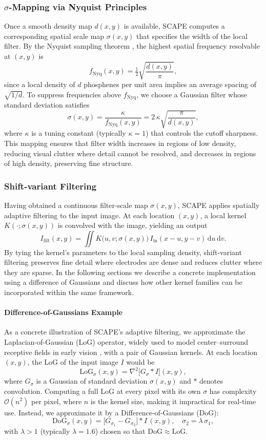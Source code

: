 \subsubsection{\(\sigma\)-Mapping via Nyquist Principles}
Once a smooth density map \(d(x,y)\) is available, SCAPE computes a corresponding spatial scale map \(\sigma(x,y)\) that specifies the width of the local filter. By the Nyquist sampling theorem \cite{Nyquist1928}, the highest spatial frequency resolvable at \((x,y)\) is
\[
f_{\mathrm{Nyq}}(x,y)
=\tfrac{1}{2}\sqrt{\frac{d(x,y)}{\pi}},
\]
since a local density of \(d\) phosphenes per unit area implies an average spacing of \(\sqrt{1/d}\). To suppress frequencies above \(f_{\mathrm{Nyq}}\), we choose a Gaussian filter whose standard deviation satisfies
\[
\sigma(x,y)
= \frac{\kappa}{f_{\mathrm{Nyq}}(x,y)}
= 2\,\kappa\sqrt{\frac{\pi}{d(x,y)}},
\]
where \(\kappa\) is a tuning constant (typically \(\kappa=1\)) that controls the cutoff sharpness. This mapping ensures that filter width increases in regions of low density, reducing visual clutter where detail cannot be resolved, and decreases in regions of high density, preserving fine structure.


\subsubsection{Shift-variant Filtering}
Having obtained a continuous filter‐scale map \(\sigma(x,y)\), SCAPE applies spatially adaptive filtering to the input image. At each location \((x,y)\), a local kernel \(K(\cdot;\sigma(x,y))\) is convolved with the image, yielding an output
\[
I_{\mathrm{filt}}(x,y)
=\iint K\bigl(u,v;\sigma(x,y)\bigr)\,
I_{\mathrm{in}}(x-u,y-v)\,\mathrm{d}u\,\mathrm{d}v.
\]
By tying the kernel’s parameters to the local sampling density, shift‐variant filtering preserves fine detail where electrodes are dense and reduces clutter where they are sparse. In the following sections we describe a concrete implementation using a difference of Gaussians and discuss how other kernel families can be incorporated within the same framework.


\paragraph{Difference-of-Gaussians Example}
As a concrete illustration of SCAPE’s adaptive filtering, we approximate the Laplacian-of-Gaussian (LoG) operator, widely used to model center–surround receptive fields in early vision \cite{Young1987}, with a pair of Gaussian kernels.  At each location \((x,y)\), the LoG of the input image \(I\) would be
\[
\mathrm{LoG}_{\sigma}(x,y)
=\nabla^2\bigl[G_{\sigma} * I\bigr](x,y),
\]
where \(G_{\sigma}\) is a Gaussian of standard deviation \(\sigma(x,y)\) and \(*\) denotes convolution.  Computing a full LoG at every pixel with its own \(\sigma\) has complexity \(\mathcal{O}(n^2)\) per pixel, where \(n\) is the kernel size, making it impractical for real-time use.  Instead, we approximate it by a Difference-of-Gaussians (DoG):
\[
\mathrm{DoG}_{\sigma}(x,y)
=\bigl[G_{\sigma_1} - G_{\sigma_2}\bigr] * I\,(x,y),
\quad \sigma_2 = \lambda\,\sigma_1,
\]
with \(\lambda>1\) (typically \(\lambda=1.6\)) chosen so that \(\mathrm{DoG}\approx\mathrm{LoG}\).

